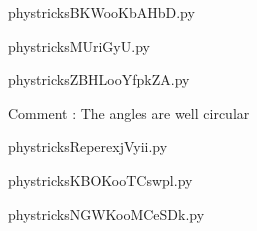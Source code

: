     \newcommand{\CaptionFigBKWooKbAHbD}{<+Type your caption here+>}
    \begin{center}
        
    \end{center}
    phystricksBKWooKbAHbD.py

    

    \clearpage
    


    \newcommand{\CaptionFigMUriGyU}{<+Type your caption here+>}
    \begin{center}
        
    \end{center}
    phystricksMUriGyU.py

    

    \clearpage
    


    \newcommand{\CaptionFigZBHLooYfpkZA}{<+Type your caption here+>}
    \begin{center}
        
    \end{center}
    phystricksZBHLooYfpkZA.py

    Comment : The angles are well circular

    \clearpage
    


    \newcommand{\CaptionFigReperexjVyii}{<+Type your caption here+>}
    \begin{center}
        
    \end{center}
    phystricksReperexjVyii.py

    

    \clearpage
    


    \newcommand{\CaptionFigKBOKooTCswpl}{<+Type your caption here+>}
    \begin{center}
        
    \end{center}
    phystricksKBOKooTCswpl.py

    

    \clearpage
    


    \newcommand{\CaptionFigNGWKooMCeSDk}{<+Type your caption here+>}
    \begin{center}
        
    \end{center}
    phystricksNGWKooMCeSDk.py

